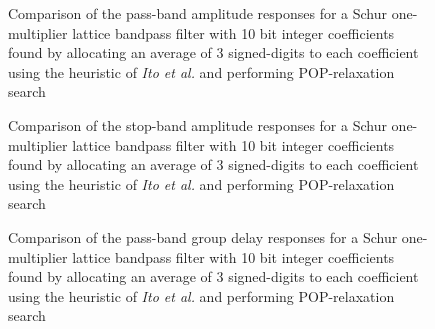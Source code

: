 \documentclass[a4paper,twoside,10pt,english]{report}
\begin{document}
\begin{figure}[!htbp]
\begin{center}
\scalebox{0.7}{}
\caption{Comparison of the pass-band amplitude responses for a Schur
  one-multiplier lattice bandpass filter with 10 bit integer coefficients found
  by allocating an average of 3 signed-digits to each coefficient using the
  heuristic of \emph{Ito et al.} and performing POP-relaxation search}
\label{fig:pop-relax-bandpass-OneM-lattice-SparsePOP-10-nbits-pass-response}
\end{center}
\end{figure}
\begin{figure}[!htbp]
\begin{center}
\scalebox{0.7}{}
\caption{Comparison of the stop-band amplitude responses for a Schur
  one-multiplier lattice bandpass filter with 10 bit integer coefficients found
  by allocating an average of 3 signed-digits to each coefficient using the
  heuristic of \emph{Ito et al.} and performing POP-relaxation search}
\label{fig:pop-relax-bandpass-OneM-lattice-SparsePOP-10-nbits-stop-response}
\end{center}
\end{figure}
\begin{figure}[!htbp]
\begin{center}
\scalebox{0.7}{}
\caption{Comparison of the pass-band group delay responses for a Schur
  one-multiplier lattice bandpass filter with 10 bit integer coefficients found
  by allocating an average of 3 signed-digits to each coefficient using the
  heuristic of \emph{Ito et al.} and performing POP-relaxation search}
\label{fig:pop-relax-bandpass-OneM-lattice-SparsePOP-10-nbits-delay-response}
\end{center}
\end{figure}

\clearpage
\end{document}
